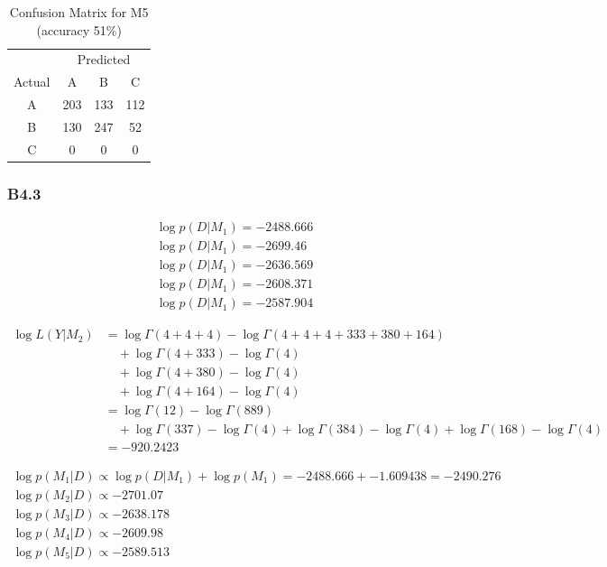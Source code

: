 \documentclass{article}
\begin{document}
\begin{table}[h!]
\centering
\label{tab:cm5}
\begin{tabular}{c|ccc}
 & \multicolumn{3}{c}{Predicted} \\
Actual & A & B & C \\
\hline
A & 203 & 133 & 112 \\
B & 130 & 247 & 52 \\
C & 0 & 0 & 0 \\
\end{tabular}
\caption{Confusion Matrix for M5 (accuracy 51\%)}
\end{table}

\subsubsection*{B4.3}
\label{sec:B:B4:3}

\begin{align*}
    \log p(D|M_1) = -2488.666 \\
    \log p(D|M_1) = -2699.46 \\
    \log p(D|M_1) = -2636.569 \\
    \log p(D|M_1) = -2608.371 \\
    \log p(D|M_1) = -2587.904
\end{align*}

\begin{align*}
    \log L(Y|M_2) &= \log\Gamma(4+4+4) - \log\Gamma(4+4+4+333+380+164) \\
    &\quad + \log\Gamma(4 + 333) - \log\Gamma(4) \\
    &\quad + \log\Gamma(4 + 380) - \log\Gamma(4) \\
    &\quad + \log\Gamma(4 + 164) - \log\Gamma(4) \\
    &= \log\Gamma(12) - \log\Gamma(889) \\
    &\quad + \log\Gamma(337) - \log\Gamma(4) + \log\Gamma(384) - \log\Gamma(4)  + \log\Gamma(168) - \log\Gamma(4) \\
    &= -920.2423
\end{align*}

\begin{align*}
    \log p(M_1|D) \propto \log p(D|M_1) + \log p(M_1) = {-2488.666} + {-1.609438} = -2490.276 \\
    \log p(M_2|D) \propto -2701.07 \\
    \log p(M_3|D) \propto -2638.178 \\
    \log p(M_4|D) \propto -2609.98 \\
    \log p(M_5|D) \propto -2589.513 \\
\end{align*}
\end{document}
